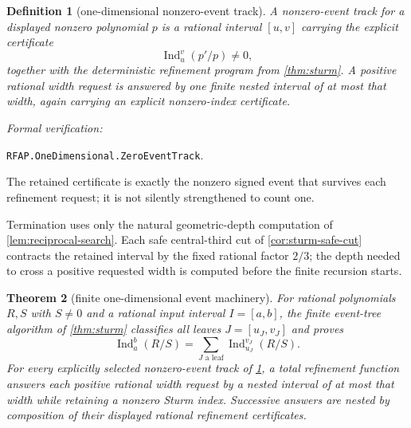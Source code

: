 \documentclass[11pt]{article}
\newtheorem{theorem}{Theorem}[section]
\newtheorem{definition}[theorem]{Definition}
\newcommand{\Ind}{\operatorname{Ind}}
\newcommand{\leanref}[1]{\par\smallskip\noindent
  \emph{Formal verification:}\par\nobreak
  {\raggedright\nolinkurl{#1}.\par}}
\begin{document}
\begin{definition}[one-dimensional nonzero-event track]
\label{def:one-dimensional-track}
A nonzero-event track for a displayed nonzero polynomial $p$ is a rational
interval $[u,v]$ carrying the explicit certificate
\[
                         \Ind_u^v(p'/p)\ne0,
\]
together with the deterministic refinement program from
\cref{thm:sturm}.  A positive rational width request is answered by one
finite nested interval of at most that width, again carrying an explicit
nonzero-index certificate.
\end{definition}

\leanref{RFAP.OneDimensional.ZeroEventTrack}

The retained certificate is exactly the nonzero signed event that survives
each refinement request; it is not silently strengthened to count one.

Termination uses only the natural geometric-depth computation of
\cref{lem:reciprocal-search}.  Each safe
central-third cut of \cref{cor:sturm-safe-cut} contracts the retained
interval by the fixed rational factor $2/3$;
the depth needed to cross a positive requested width is computed before the
finite recursion starts.

\begin{theorem}[finite one-dimensional event machinery]
\label{thm:1d-isolation}
For rational polynomials $R,S$ with $S\ne0$ and a rational input interval
$I=[a,b]$, the finite event-tree algorithm of \cref{thm:sturm} classifies
all leaves $J=[u_J,v_J]$ and proves
\[
 \Ind_a^b(R/S)
   =\sum_{J\text{ a leaf}}\Ind_{u_J}^{v_J}(R/S).
\]
For every explicitly selected nonzero-event track of
\cref{def:one-dimensional-track}, a total refinement function answers each
positive rational width request by a nested interval of at most that width
while retaining a nonzero Sturm index.  Successive answers are nested by
composition of their displayed rational refinement certificates.
\end{theorem}
\end{document}
